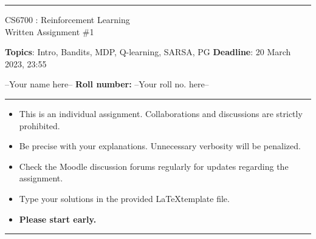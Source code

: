 \documentclass[addpoints,12pt,solution]{exam}
\begin{document}
\hrule
\vspace{1mm}
\noindent 
\begin{center}
{\Large CS6700 : Reinforcement Learning} \\
{\large Written Assignment \#1}
\end{center}
\vspace{1mm}
\noindent 
{\textbf{Topics}: Intro, Bandits, MDP, Q-learning, SARSA, PG \hfill \textbf{Deadline}: 20 March 2023, 23:55}


--Your name here--  \hfill {\bf Roll number: }--Your roll no. here-- 
\vspace{2mm}
\hrule

{\small

\begin{itemize}\itemsep0mm
\item This is an individual assignment. Collaborations and discussions are strictly
prohibited.
\item Be precise with your explanations. Unnecessary verbosity will be penalized.
\item Check the Moodle discussion forums regularly for updates regarding the assignment.
\item Type your solutions in the provided \LaTeX template file.
\item \textbf{Please start early.}
\end{itemize}
}

\hrule

\vspace{3mm}




\end{document}
